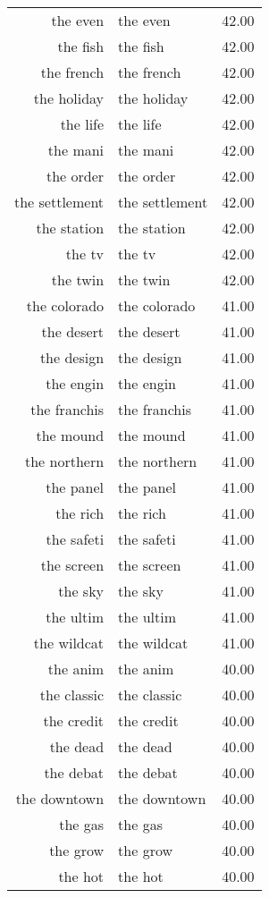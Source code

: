 \begin{table}[ht]
\begin{tabular}{rlr}
  the even & the even & 42.00 \\ 
  the fish & the fish & 42.00 \\ 
  the french & the french & 42.00 \\ 
  the holiday & the holiday & 42.00 \\ 
  the life & the life & 42.00 \\ 
  the mani & the mani & 42.00 \\ 
  the order & the order & 42.00 \\ 
  the settlement & the settlement & 42.00 \\ 
  the station & the station & 42.00 \\ 
  the tv & the tv & 42.00 \\ 
  the twin & the twin & 42.00 \\ 
  the colorado & the colorado & 41.00 \\ 
  the desert & the desert & 41.00 \\ 
  the design & the design & 41.00 \\ 
  the engin & the engin & 41.00 \\ 
  the franchis & the franchis & 41.00 \\ 
  the mound & the mound & 41.00 \\ 
  the northern & the northern & 41.00 \\ 
  the panel & the panel & 41.00 \\ 
  the rich & the rich & 41.00 \\ 
  the safeti & the safeti & 41.00 \\ 
  the screen & the screen & 41.00 \\ 
  the sky & the sky & 41.00 \\ 
  the ultim & the ultim & 41.00 \\ 
  the wildcat & the wildcat & 41.00 \\ 
  the anim & the anim & 40.00 \\ 
  the classic & the classic & 40.00 \\ 
  the credit & the credit & 40.00 \\ 
  the dead & the dead & 40.00 \\ 
  the debat & the debat & 40.00 \\ 
  the downtown & the downtown & 40.00 \\ 
  the gas & the gas & 40.00 \\ 
  the grow & the grow & 40.00 \\ 
  the hot & the hot & 40.00 \\ 

\end{tabular}
\end{table}

